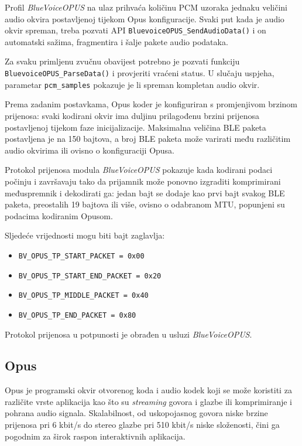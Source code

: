 Profil \textit{BlueVoiceOPUS} na ulaz prihvaća količinu PCM uzoraka jednaku veličini audio okvira postavljenoj tijekom Opus konfiguracije. Svaki put kada je audio okvir spreman, treba pozvati API \lstinline|BluevoiceOPUS_SendAudioData()| i on automatski sažima, fragmentira i šalje pakete audio podataka.

Za svaku primljenu zvučnu obavijest potrebno je pozvati funkciju \newline \lstinline|BluevoiceOPUS_ParseData()| i provjeriti vraćeni status. U slučaju uspjeha, parametar \lstinline|pcm_samples| pokazuje je li spreman kompletan audio okvir.

Prema zadanim postavkama, Opus koder je konfiguriran s promjenjivom brzinom prijenosa: svaki kodirani okvir ima  duljinu prilagođenu brzini prijenosa postavljenoj tijekom faze inicijalizacije. Maksimalna veličina BLE paketa postavljena je na 150 bajtova, a broj BLE paketa može varirati među različitim audio okvirima ili ovisno o konfiguraciji Opusa.

Protokol prijenosa modula \textit{BlueVoiceOPUS} pokazuje kada kodirani podaci počinju i završavaju tako da prijamnik može ponovno izgraditi komprimirani međuspremnik i dekodirati ga: jedan bajt se dodaje kao prvi bajt svakog BLE paketa, preostalih 19 bajtova ili više, ovisno o odabranom MTU, popunjeni su podacima kodiranim Opusom.

Sljedeće vrijednosti mogu biti bajt zaglavlja:
\begin{itemize}
	\item \lstinline|BV_OPUS_TP_START_PACKET = 0x00|
	\item \lstinline|BV_OPUS_TP_START_END_PACKET = 0x20|
	\item \lstinline|BV_OPUS_TP_MIDDLE_PACKET = 0x40|
	\item \lstinline|BV_OPUS_TP_END_PACKET = 0x80|
\end{itemize}

Protokol prijenosa u potpunosti je obrađen u usluzi \textit{BlueVoiceOPUS}.
\subsection{Opus}
Opus je programski okvir otvorenog koda i audio kodek koji se može koristiti za različite vrste aplikacija kao što su \textit{streaming} govora i glazbe ili komprimiranje i pohrana audio signala. Skalabilnost, od uskopojasnog govora niske brzine prijenosa pri 6 kbit/s do stereo glazbe pri 510 kbit/s niske složenosti, čini ga pogodnim za širok raspon interaktivnih aplikacija.

